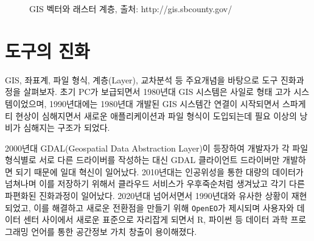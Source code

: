 \documentclass[
  a4paper,showtrims,openright,hidelinks]{oblivoir}
\begin{document}
\begin{figure}


\caption{\label{fig-layers}GIS 벡터와 래스터 계층, 출처:
http://gis.sbcounty.gov/}

\end{figure}%

\section{도구의 진화}\label{uxb3c4uxad6cuxc758-uxc9c4uxd654}

GIS, 좌표계, 파일 형식, 계층(Layer), 교차분석 등 주요개념을 바탕으로
도구 진화과정을 살펴보자. 초기 PC가 보급되면서 1980년대 GIS 시스템은
사일로 형태 고가 시스템이었으며, 1990년대에는 1980년대 개발된 GIS
시스템간 연결이 시작되면서 스파게티 현상이 심해지면서 새로운
애플리케이션과 파일 형식이 도입되는데 필요 이상의 낭비가 심해지는 구조가
되었다.

2000년대 GDAL(Geospatial Data Abstraction Layer)이 등장하여 개발자가 각
파일 형식별로 서로 다른 드라이버를 작성하는 대신 GDAL 클라이언트
드라이버만 개발하면 되기 때문에 일대 혁신이 일어났다. 2010년대는
인공위성을 통한 대량의 데이터가 넘쳐나며 이를 저장하기 위해서 클라우드
서비스가 우후죽순처럼 생겨났고 각기 다른 파편화된 진화과정이 일어났다.
2020년대 넘어서면서 1990년대와 유사한 상황이 재현되었고, 이를 해결하고
새로운 전환점을 만들기 위해 \texttt{OpenEO}가 제시되며 사용자와 데이터
센터 사이에서 새로운 표준으로 자리잡게 되면서 R, 파이썬 등 데이터 과학
프로그래밍 언어를 통한 공간정보 가치 창출이 용이해졌다.
\autocite{Pebesma2016}
\end{document}
